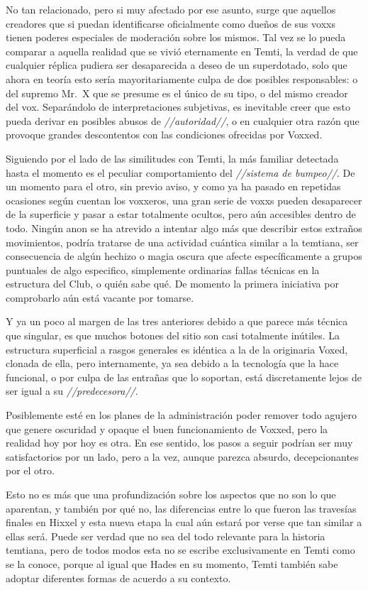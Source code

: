 \documentclass[
  spanish,
]{book}
\begin{document}
No tan relacionado, pero si muy afectado por ese asunto, surge que aquellos creadores que si puedan identificarse oficialmente como dueños de sus voxxs tienen poderes especiales de moderación sobre los mismos. Tal vez se lo pueda comparar a aquella realidad que se vivió eternamente en Temti, la verdad de que cualquier réplica pudiera ser desaparecida a deseo de un superdotado, solo que ahora en teoría esto sería mayoritariamente culpa de dos posibles responsables: o del supremo Mr.~X que se presume es el único de su tipo, o del mismo creador del vox. Separándolo de interpretaciones subjetivas, es inevitable creer que esto pueda derivar en posibles abusos de \emph{//autoridad//}, o en cualquier otra razón que provoque grandes descontentos con las condiciones ofrecidas por Voxxed.

Siguiendo por el lado de las similitudes con Temti, la más familiar detectada hasta el momento es el peculiar comportamiento del \emph{//sistema de bumpeo//}. De un momento para el otro, sin previo aviso, y como ya ha pasado en repetidas ocasiones según cuentan los voxxeros, una gran serie de voxxs pueden desaparecer de la superficie y pasar a estar totalmente ocultos, pero aún accesibles dentro de todo. Ningún anon se ha atrevido a intentar algo más que describir estos extraños movimientos, podría tratarse de una actividad cuántica similar a la temtiana, ser consecuencia de algún hechizo o magia oscura que afecte específicamente a grupos puntuales de algo especifico, simplemente ordinarias fallas técnicas en la estructura del Club, o quién sabe qué. De momento la primera iniciativa por comprobarlo aún está vacante por tomarse.

Y ya un poco al margen de las tres anteriores debido a que parece más técnica que singular, es que muchos botones del sitio son casi totalmente inútiles. La estructura superficial a rasgos generales es idéntica a la de la originaria Voxed, clonada de ella, pero internamente, ya sea debido a la tecnología que la hace funcional, o por culpa de las entrañas que lo soportan, está discretamente lejos de ser igual a su \emph{//predecesora//}.

Posiblemente esté en los planes de la administración poder remover todo agujero que genere oscuridad y opaque el buen funcionamiento de Voxxed, pero la realidad hoy por hoy es otra.
En ese sentido, los pasos a seguir podrían ser muy satisfactorios por un lado, pero a la vez, aunque parezca absurdo, decepcionantes por el otro.

Esto no es más que una profundización sobre los aspectos que no son lo que aparentan, y también por qué no, las diferencias entre lo que fueron las travesías finales en Hixxel y esta nueva etapa la cual aún estará por verse que tan similar a ellas será. Puede ser verdad que no sea del todo relevante para la historia temtiana, pero de todos modos esta no se escribe exclusivamente en Temti como se la conoce, porque al igual que Hades en su momento, Temti también sabe adoptar diferentes formas de acuerdo a su contexto.
\end{document}
